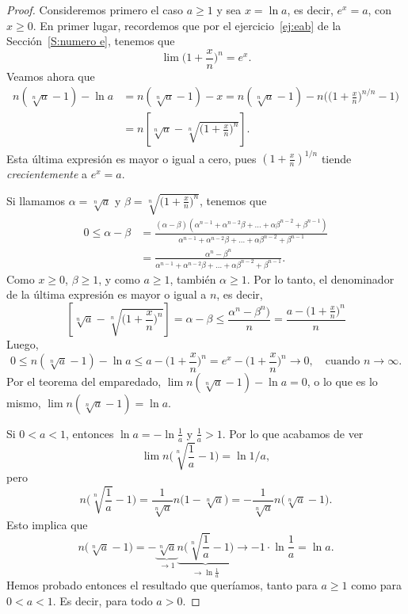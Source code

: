 \begin{proof}
    Consideremos primero el caso $a\ge 1$ y sea $x=\ln a$, es decir, $e^x=a$, con $x\ge 0$.
    En primer lugar, recordemos que por el ejercicio~\ref{ej:eab} de la Sección~\ref{S:numero e}, tenemos que 
    \[
    \lim\big(1+\frac xn\big)^n = e^x.
    \]
    Veamos ahora que 
    \begin{align*}
        n (\sqrt[n]{a}-1) - \ln a &= n (\sqrt[n]{a}-1) - x 
        = n (\sqrt[n]{a}-1) - n\big( (1+\frac xn\big)^{n/n} - 1\big)
        \\
        &= n \left[ \sqrt[n]{a} - \sqrt[n]{(1+\frac xn\big)^n} \right].
    \end{align*}
    Esta última expresión es mayor o igual a cero, pues $(1+\frac xn)^{1/n}$ tiende \emph{crecientemente} a $e^x=a$.
    
    Si llamamos $\alpha = \sqrt[n]{a} $ y $\beta =  \sqrt[n]{(1+\frac xn\big)^n}$, tenemos que 
    \begin{align*}
    0\le \alpha - \beta 
    &= \frac{(\alpha-\beta)(\alpha^{n-1}+\alpha^{n-2}\beta + \dots +\alpha \beta^{n-2}+\beta^{n-1})}{\alpha^{n-1}+\alpha^{n-2}\beta + \dots +\alpha \beta^{n-2}+\beta^{n-1}}
    \\
    &= \frac{\alpha^n-\beta^n}{\alpha^{n-1}+\alpha^{n-2}\beta + \dots +\alpha \beta^{n-2}+\beta^{n-1}}.
    \end{align*}
    Como $x\ge 0$, $\beta \ge 1$, y como $a\ge 1$, también $\alpha \ge 1$.
    Por lo tanto, el denominador de la última expresión es mayor o igual a $n$, es decir, 
    \[
    \left[ \sqrt[n]{a} - \sqrt[n]{(1+\frac xn\big)^n} \right] 
    = \alpha - \beta \le \frac{\alpha^n - \beta^n) }n
    = \frac{ a - (1+\frac xn\big)^n}n
    \]
    Luego, 
    \[
    0\le n (\sqrt[n]{a}-1) - \ln a \le  a - (1+\frac xn\big)^n 
    = e^x - (1+\frac xn\big)^n\to 0, \quad\text{cuando $n\to\infty$}.
    \]
    Por el teorema del emparedado, $\lim n (\sqrt[n]{a}-1) - \ln a =0$, o lo que es lo mismo,
    $\lim n (\sqrt[n]{a}-1) = \ln a $.

    Si $0<a<1$, entonces $\ln a = - \ln \frac1a$ y $\frac1a>1$.
    Por lo que acabamos de ver
    \[ 
    \lim n \big(\sqrt[n]{\frac1a}-1\big) = \ln 1/a,
    \]
    pero 
    \[
    n \big(\sqrt[n]{\frac1a}-1\big) 
    = \frac{1}{\sqrt[n]{a}} n \big(1-\sqrt[n]{a}\big)
    = -\frac{1}{\sqrt[n]{a}} n \big(\sqrt[n]{a}-1\big).
    \]
    Esto implica que 
\[
n \big(\sqrt[n]{a}-1\big) = -\underbrace{\sqrt[n]{a}}_{\to 1} \underbrace{n \big(\sqrt[n]{\frac1a}-1\big) }_{\to \ln \frac1a} 
\to - 1 \cdot \ln\frac1a = \ln a.
\]
Hemos probado entonces el resultado que queríamos, tanto para $a\ge 1$ como para $0<a<1$. Es decir, para todo $a>0$.
    \end{proof}

